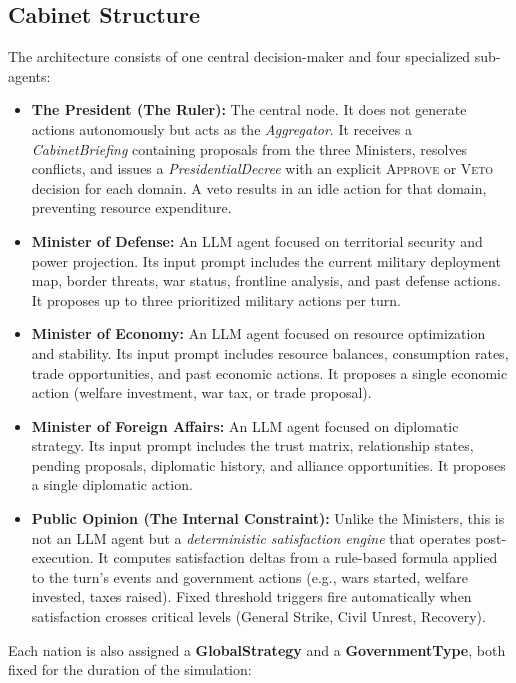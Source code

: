 \subsection{Cabinet Structure}
The architecture consists of one central decision-maker and four specialized sub-agents:
\begin{itemize}
    \item \textbf{The President (The Ruler):} The central node. It does not generate actions autonomously but acts as the \textit{Aggregator}. It receives a \textit{CabinetBriefing} containing proposals from the three Ministers, resolves conflicts, and issues a \textit{PresidentialDecree} with an explicit \textsc{Approve} or \textsc{Veto} decision for each domain. A veto results in an idle action for that domain, preventing resource expenditure.
    \item \textbf{Minister of Defense:} An LLM agent focused on territorial security and power projection. Its input prompt includes the current military deployment map, border threats, war status, frontline analysis, and past defense actions. It proposes up to three prioritized military actions per turn.
    \item \textbf{Minister of Economy:} An LLM agent focused on resource optimization and stability. Its input prompt includes resource balances, consumption rates, trade opportunities, and past economic actions. It proposes a single economic action (welfare investment, war tax, or trade proposal).
    \item \textbf{Minister of Foreign Affairs:} An LLM agent focused on diplomatic strategy. Its input prompt includes the trust matrix, relationship states, pending proposals, diplomatic history, and alliance opportunities. It proposes a single diplomatic action.
    \item \textbf{Public Opinion (The Internal Constraint):} Unlike the Ministers, this is not an LLM agent but a \textit{deterministic satisfaction engine} that operates post-execution. It computes satisfaction deltas from a rule-based formula applied to the turn's events and government actions (e.g., wars started, welfare invested, taxes raised). Fixed threshold triggers fire automatically when satisfaction crosses critical levels (General Strike, Civil Unrest, Recovery).
\end{itemize}

Each nation is also assigned a \textbf{GlobalStrategy} and a \textbf{GovernmentType}, both fixed for the duration of the simulation:

